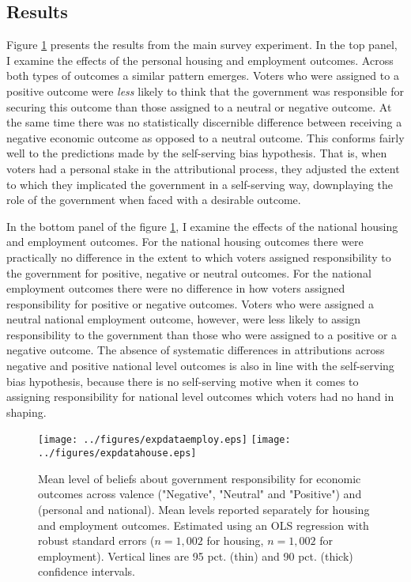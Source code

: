 \documentclass[a4paper,11pt]{article}
\begin{document}
	\subsection*{Results}
	Figure \ref{experiment} presents the results from the main survey experiment. In the top panel, I examine the effects of the personal housing and employment outcomes. Across both types of outcomes a similar pattern emerges. Voters who were assigned to a positive outcome were \emph{less} likely to think that the government was responsible for securing this outcome than those assigned to a neutral or negative outcome. At the same time there was no statistically discernible difference between receiving a negative economic outcome as opposed to a neutral outcome. This conforms fairly well to the predictions made by the self-serving bias hypothesis. That is, when voters had a personal stake in the attributional process, they adjusted the extent to which they implicated the government in a self-serving way, downplaying the role of the government when faced with a desirable outcome.
	
	
	In the bottom panel of the figure \ref{experiment}, I examine the effects of the national housing and employment outcomes. For the national housing outcomes there were practically no difference in the extent to which voters assigned responsibility to the government for positive, negative or neutral outcomes. For the national employment outcomes there were no difference in how voters assigned responsibility for positive or negative outcomes. Voters who were assigned a neutral national employment outcome, however, were less likely to assign responsibility to the government than those who were assigned to a positive or a negative outcome. The absence of systematic differences in attributions across negative and positive national level outcomes is also in line with the self-serving bias hypothesis, because there is no self-serving motive when it comes to assigning responsibility for national level outcomes which voters had no hand in shaping.
	
	
	
	\begin{figure}
		\texttt{[image: ../figures/expdataemploy.eps]} \centering
		\texttt{[image: ../figures/expdatahouse.eps]} \centering
		
		\caption{Mean level of beliefs about government responsibility for economic outcomes across valence ("Negative", "Neutral" and "Positive") and  (personal and national). Mean levels reported separately for housing and employment outcomes. Estimated using  an OLS regression with robust standard errors ($n=1,002$ for housing, $n=1,002$ for employment). Vertical lines are 95 pct. (thin) and 90 pct. (thick) confidence intervals.} %
		\label{experiment}
	\end{figure}
	
\end{document}
